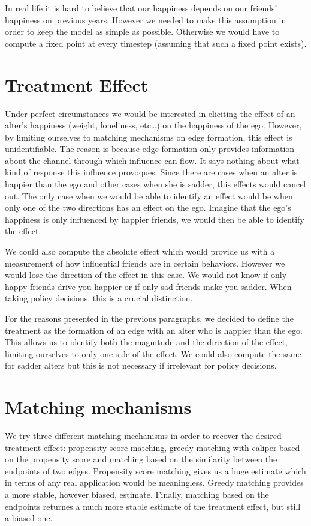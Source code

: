 \documentclass[11pt]{article}
\begin{document}
In real life it is hard to believe that our happiness depends on our friends’ happiness on previous years. However we needed to make this assumption in order to keep the model as simple as possible. Otherwise we would have to compute a fixed point at every timestep (assuming that such a fixed point exists). 


\section{Treatment Effect}
\label{Treatment Effect}
Under perfect circumstances we would be interested in eliciting the effect of an alter’s happiness (weight, loneliness, etc…) on the happiness of the ego. However, by limiting ourselves to matching mechanisms on edge formation, this effect is unidentifiable. The reason is because edge formation only provides information about the channel through which influence can flow. It says nothing about what kind of response this influence provoques. Since there are cases when an alter is happier than the ego and other cases when she is sadder, this effects would cancel out. The only case when we would be able to identify an effect would be when only one of the two directions has an effect on the ego. Imagine that the ego’s happiness is only influenced by happier friends, we would then be able to identify the effect. 

We could also compute the absolute effect which would provide us with a measurement of how influential friends are in certain behaviors. However we would lose the direction of the effect in this case. We would not know if only happy friends drive you happier or if only sad friends make you sadder. When taking policy decisions, this is a crucial distinction. 

For the reasons presented in the previous paragraphs, we decided to define the treatment as the formation of an edge with an alter who is happier than the ego. This allows us to identify both the magnitude and the direction of the effect, limiting ourselves to only one side of the effect. We could also compute the same for sadder alters but this is not necessary if irrelevant for policy decisions. 

\section{Matching mechanisms}
\label{Matching Mechanisms}
We try three different matching mechanisms in order to recover the desired treatment effect: propensity score matching, greedy matching with caliper based on the propensity score and matching based on the similarity between the endpoints of two edges. Propensity score matching gives us a huge estimate which in terms of any real application would be meaningless. Greedy matching provides a more stable, however biased, estimate. Finally, matching based on the endpoints returnes a much more stable estimate of the treatment effect, but still a biased one. 
\end{document}
